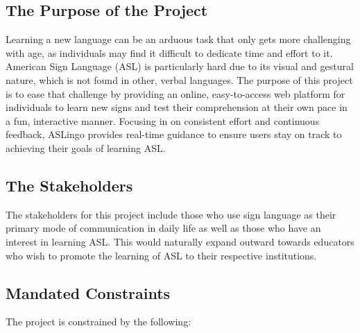 \documentclass[12pt, titlepage]{article}
\begin{document}
\subsection{The Purpose of the Project}

Learning a new language can be an arduous task that only gets more challenging
with age, as individuals may find it difficult to dedicate time and effort to
it. American Sign Language (ASL) is particularly hard due to its visual and
gestural nature, which is not found in other, verbal languages. The purpose of this project is
to ease that challenge by providing an online, easy-to-access web platform for
individuals to learn new signs and test their comprehension at their own pace
in a fun, interactive manner. Focusing in on consistent effort and continuous
feedback, ASLingo provides real-time guidance to ensure users stay on track to
achieving their goals of learning ASL.

\subsection{The Stakeholders}

 The stakeholders for this project include those who use sign language as their primary mode of communication in daily life as well as those who have an interest in learning ASL. This would naturally expand outward towards educators who wish to promote the learning of ASL to their respective institutions. 




\subsection{Mandated Constraints}

The project is constrained by the following:
\end{document}
